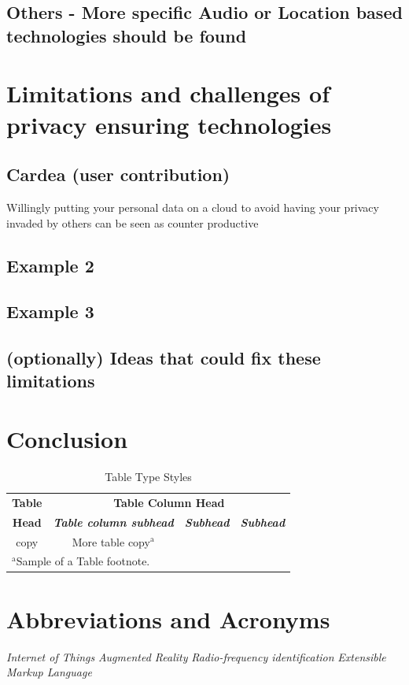 \documentclass[conference]{IEEEtran}
\begin{document}
\subsection{Others - More specific Audio or Location based technologies should be found}


\section{Limitations and challenges of privacy ensuring technologies}\label{Limitations}
\subsection{Cardea (user contribution)}
Willingly putting your personal data on a cloud to avoid having your privacy invaded by others can be seen as counter productive
\subsection{Example 2}
\subsection{Example 3}
\subsection{(optionally) Ideas that could fix these limitations}

\section{Conclusion}\label{Conclusion}


\begin{table}[htbp]
\caption{Table Type Styles}
\begin{center}
\begin{tabular}{|c|c|c|c|}
\hline
\textbf{Table}&\multicolumn{3}{|c|}{\textbf{Table Column Head}} \\
\cline{2-4} 
\textbf{Head} & \textbf{\textit{Table column subhead}}& \textbf{\textit{Subhead}}& \textbf{\textit{Subhead}} \\
\hline
copy& More table copy$^{\mathrm{a}}$& &  \\
\hline
\multicolumn{4}{l}{$^{\mathrm{a}}$Sample of a Table footnote.}
\end{tabular}
\label{tab1}
\end{center}
\end{table}

\section*{Abbreviations and Acronyms}
\begin{acronym}[Bash]
 {\textit{Internet of Things}}
 {\textit{Augmented Reality}}
 {\textit{Radio-frequency identification}}
 {\textit{Extensible Markup Language}}
\end{acronym}


{\footnotesize
}
\end{document}
